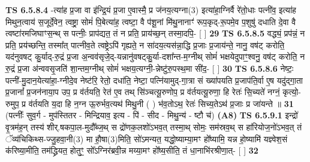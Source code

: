 \documentclass[17pt]{extarticle}
\begin{document}
                  \newline
                                \textbf{ TS 6.5.8.4} \newline
                  -त्या॑ह प्र॒जा वा इ॑न्द्रि॒यं प्र॒जा ए॒वास्मै॒ प्र ज॑नय॒त्यग्ना(3) इत्या॑हा॒ग्निर्वै रे॑तो॒धाः पत्नी॑व॒ इत्या॑ह मिथुन॒त्वाय॑ स॒जूर्दे॒वेन॒ त्वष्ट्रा॒ सोमं॑ पि॒बेत्या॑ह॒ त्वष्टा॒ वै प॑शू॒नां मि॑थु॒नानाꣳ॑ रूप॒कृद्-रू॒पमे॒व प॒शुषु॑ दधाति दे॒वा वै त्वष्टा॑रमजिघाꣳस॒न्थ् स पत्नीः॒ प्राप॑द्यत॒ तं न प्रति॒ प्राय॑च्छ॒न् तस्मा॒दपि॒- [  ] \textbf{  29} \newline
                  \newline
                                \textbf{ TS 6.5.8.5} \newline
                  वद्ध्यं॒ प्रप॑न्नं॒ न प्रति॒ प्रय॑च्छन्ति॒ तस्मा᳚त् पात्नीव॒ते त्वष्ट्रेऽपि॑ गृह्यते॒ न सा॑दय॒त्यस॑न्ना॒द्धि प्र॒जाः प्र॒जाय॑न्ते॒ नानु॒ वष॑ट् करोति॒ यद॑नुवषट् कु॒र्याद्-रु॒द्रं प्र॒जा अ॒न्वव॑सृजे॒द्-यन्नानु॑वषट्कु॒र्या-दशा᳚न्त-म॒ग्नीथ् सोमं॑ भक्षयेदुपाꣳ॒॒श्वनु॒ वष॑ट् करोति॒ न रु॒द्रं प्र॒जा अ॑न्ववसृ॒जति॑ शा॒न्तम॒ग्नीथ् सोमं॑ भक्षय॒त्यग्नी॒-न्नेष्टु॑रु॒पस्थ॒मा सी॑द॒- [  ] \textbf{  30} \newline
                  \newline
                                \textbf{ TS 6.5.8.6} \newline
                  नेष्टः॒ पत्नी॑-मु॒दान॒येत्या॑हा॒-ग्नीदे॒व नेष्ट॑रि॒ रेतो॒ दधा॑ति॒ नेष्टा॒ पत्नि॑यामुद्-गा॒त्रा सं ख्या॑पयति प्र॒जाप॑ति॒र्वा ए॒ष यदु॑द्गा॒ता प्र॒जानां᳚ प्र॒जन॑नाया॒प उप॒ प्र व॑र्तयति॒ रेत॑ ए॒व तथ् सि॑ञ्चत्यू॒रुणोप॒ प्र व॑र्तयत्यू॒रुणा॒ हि रेतः॑ सि॒च्यते॑ नग्नं॒ कृत्यो॒-रुमुप॒ प्र व॑र्तयति य॒दा हि न॒ग्न ऊ॒रुर्भव॒त्यथ॑ मिथु॒नी ( ) भ॑व॒तोऽथ॒ रेतः॑ सिच्य॒तेऽथ॑ प्र॒जाः प्र जा॑यन्ते ॥ \textbf{  31} \newline
                  \newline
                      (पत्नीः᳚ सुव॒र्ग - मुप॑स्तितर - मिन्द्रियाव॒ इत्य - पि॑ - सीद - मिथु॒न्य॑ - ष्टौ च॑)  \textbf{(A8)} \newline \newline
                                        \textbf{ TS 6.5.9.1} \newline
                  इन्द्रो॑ वृ॒त्रम॑ह॒न् तस्य॑ शीर्.षकपा॒ल-मुदौ᳚ब्ज॒थ् स द्रो॑णक॒लशो॑ऽभव॒त् तस्मा॒थ् सोमः॒ सम॑स्रव॒थ् स हा॑रियोज॒नो॑ऽभव॒त् तं ॅव्य॑चिकिथ्स-ज्जु॒हवा॒नी(3) मा हौ॒षा(3)मिति॒ सो॑ऽमन्यत॒ यद्धो॒ष्याम्या॒मꣳ हो᳚ष्यामि॒ यन्न हो॒ष्यामि॑ यज्ञ्वेश॒सं क॑रिष्या॒मीति॒ तम॑द्ध्रियत॒ होतुꣳ॒॒ सो᳚ऽग्निर॑ब्रवी॒न्न मय्या॒मꣳ हो᳚ष्य॒सीति॒ तं धा॒नाभि॑रश्रीणा॒त्- [  ] \textbf{  32} \newline
\end{document}
